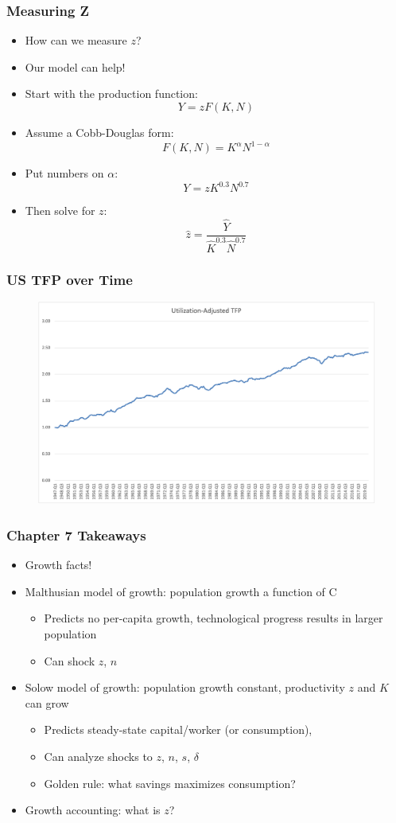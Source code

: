 \documentclass{beamer}
\begin{document}
\begin{frame}
\frametitle[alignment=center]{Measuring Z}
\begin{itemize}
\item How can we measure $z$?
\bigskip
\item Our model can help!
\item Start with the production function:
$$Y=zF(K,N)$$
\item Assume a Cobb-Douglas form:
$$F(K,N)=K^\alpha N^{1-\alpha}$$
\item Put numbers on $\alpha$:
$$Y=zK^{0.3}N^{0.7}$$
\item Then solve for $z$:
$$\hat{z}=\frac{\hat{Y}}{\hat{K}^{0.3}\hat{N}^{0.7}}$$
\end{itemize}
\end{frame}

\begin{frame}
\frametitle[alignment=center]{US TFP over Time}
\begin{figure}
\centering
\includegraphics[scale=0.5]{Figures/TFP.png}
\end{figure}
\end{frame}


\begin{frame}
\frametitle[alignment=center]{Chapter 7 Takeaways}
\begin{itemize}
\item Growth facts!
\bigskip
\item Malthusian model of growth:  population growth a function of C
\begin{itemize}
\item Predicts no per-capita growth, technological progress results in larger population
\item Can shock $z$, $n$
\end{itemize}
\item Solow model of growth:  population growth constant, productivity $z$ and $K$ can grow
\begin{itemize}
\item Predicts steady-state capital/worker (or consumption), 
\item Can analyze shocks to $z$, $n$, $s$, $\delta$
\item Golden rule:  what savings maximizes consumption? 
\end{itemize}
\item Growth accounting:  what is $z$?
\end{itemize}
\end{frame}
\end{document}
